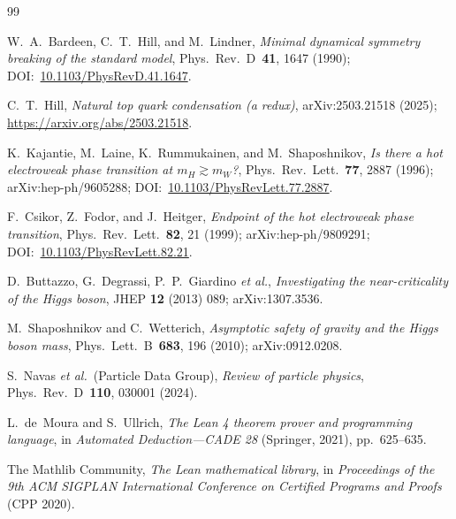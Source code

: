 \documentclass[aps,prd,twocolumn,showpacs,superscriptaddress,nofootinbib]{revtex4-2}
\begin{document}
\begin{thebibliography}{99}

W.~A.~Bardeen, C.~T.~Hill, and M.~Lindner,
\emph{Minimal dynamical symmetry breaking of the standard model},
Phys.~Rev.~D~\textbf{41}, 1647 (1990); DOI:~\href{https://doi.org/10.1103/PhysRevD.41.1647}{10.1103/PhysRevD.41.1647}.

C.~T.~Hill,
\emph{Natural top quark condensation (a redux)},
arXiv:2503.21518 (2025); \url{https://arxiv.org/abs/2503.21518}.

K.~Kajantie, M.~Laine, K.~Rummukainen, and M.~Shaposhnikov,
\emph{Is there a hot electroweak phase transition at $m_H \gtrsim m_W$?},
Phys.~Rev.~Lett.~\textbf{77}, 2887 (1996); arXiv:hep-ph/9605288;
DOI:~\href{https://doi.org/10.1103/PhysRevLett.77.2887}{10.1103/PhysRevLett.77.2887}.

F.~Csikor, Z.~Fodor, and J.~Heitger,
\emph{Endpoint of the hot electroweak phase transition},
Phys.~Rev.~Lett.~\textbf{82}, 21 (1999); arXiv:hep-ph/9809291;
DOI:~\href{https://doi.org/10.1103/PhysRevLett.82.21}{10.1103/PhysRevLett.82.21}.

D.~Buttazzo, G.~Degrassi, P.~P.~Giardino \textit{et al.},
\emph{Investigating the near-criticality of the Higgs boson},
JHEP \textbf{12} (2013) 089; arXiv:1307.3536.

M.~Shaposhnikov and C.~Wetterich,
\emph{Asymptotic safety of gravity and the Higgs boson mass},
Phys.~Lett.~B~\textbf{683}, 196 (2010); arXiv:0912.0208.

S.~Navas \textit{et al.}~(Particle Data Group),
\emph{Review of particle physics},
Phys.~Rev.~D~\textbf{110}, 030001 (2024).

L.~de~Moura and S.~Ullrich,
\emph{The Lean 4 theorem prover and programming language},
in \emph{Automated Deduction---CADE 28} (Springer, 2021), pp.~625--635.

The Mathlib Community,
\emph{The Lean mathematical library},
in \emph{Proceedings of the 9th ACM SIGPLAN International Conference on Certified Programs and Proofs} (CPP 2020).

\end{thebibliography}
\end{document}
